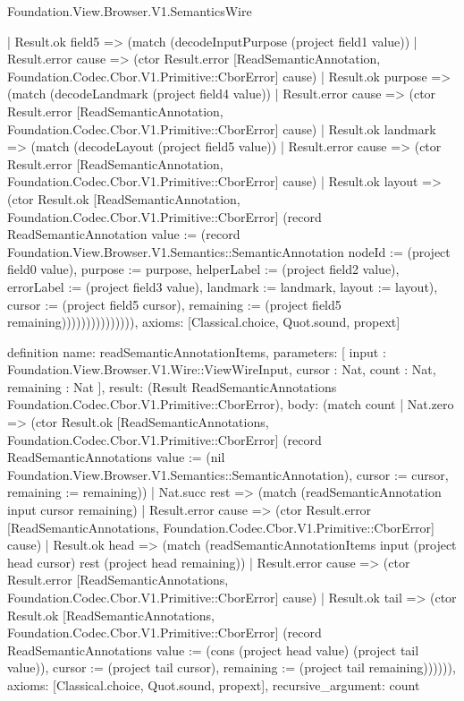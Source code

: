 \begin{lexlean}{Foundation.View.Browser.V1.SemanticsWire}
\begin{semanticmodule}
{                    | Result.ok field5 => (match (decodeInputPurpose (project field1 value))
                      | Result.error cause => (ctor Result.error [ReadSemanticAnnotation, Foundation.Codec.Cbor.V1.Primitive::CborError] cause)
                      | Result.ok purpose => (match (decodeLandmark (project field4 value))
                        | Result.error cause => (ctor Result.error [ReadSemanticAnnotation, Foundation.Codec.Cbor.V1.Primitive::CborError] cause)
                        | Result.ok landmark => (match (decodeLayout (project field5 value))
                          | Result.error cause => (ctor Result.error [ReadSemanticAnnotation, Foundation.Codec.Cbor.V1.Primitive::CborError] cause)
                          | Result.ok layout => (ctor Result.ok [ReadSemanticAnnotation, Foundation.Codec.Cbor.V1.Primitive::CborError] (record ReadSemanticAnnotation {value := (record Foundation.View.Browser.V1.Semantics::SemanticAnnotation {nodeId := (project field0 value), purpose := purpose, helperLabel := (project field2 value), errorLabel := (project field3 value), landmark := landmark, layout := layout}), cursor := (project field5 cursor), remaining := (project field5 remaining)})))))))))))))),
  axioms: [Classical.choice, Quot.sound, propext]
}

definition{
  name: readSemanticAnnotationItems,
  parameters: [
    input : Foundation.View.Browser.V1.Wire::ViewWireInput,
    cursor : Nat,
    count : Nat,
    remaining : Nat
  ],
  result: (Result ReadSemanticAnnotations Foundation.Codec.Cbor.V1.Primitive::CborError),
  body: (match count
    | Nat.zero => (ctor Result.ok [ReadSemanticAnnotations, Foundation.Codec.Cbor.V1.Primitive::CborError] (record ReadSemanticAnnotations {value := (nil Foundation.View.Browser.V1.Semantics::SemanticAnnotation), cursor := cursor, remaining := remaining}))
    | Nat.succ rest => (match (readSemanticAnnotation input cursor remaining)
      | Result.error cause => (ctor Result.error [ReadSemanticAnnotations, Foundation.Codec.Cbor.V1.Primitive::CborError] cause)
      | Result.ok head => (match (readSemanticAnnotationItems input (project head cursor) rest (project head remaining))
        | Result.error cause => (ctor Result.error [ReadSemanticAnnotations, Foundation.Codec.Cbor.V1.Primitive::CborError] cause)
        | Result.ok tail => (ctor Result.ok [ReadSemanticAnnotations, Foundation.Codec.Cbor.V1.Primitive::CborError] (record ReadSemanticAnnotations {value := (cons (project head value) (project tail value)), cursor := (project tail cursor), remaining := (project tail remaining)}))))),
  axioms: [Classical.choice, Quot.sound, propext],
  recursive_argument: count
}


\end{semanticmodule}
\end{lexlean}
